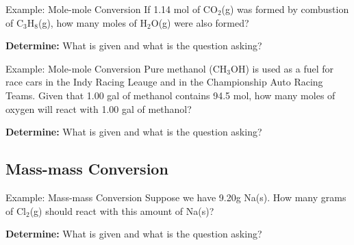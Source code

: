 \documentclass[11pt]{beamer}
\begin{document}
\begin{frame}{Example: Mole-mole Conversion}
  If 1.14 mol of CO$_2$(g) was formed by combustion of C$_3$H$_8$(g),
  how many moles of H$_2$O(g) were also formed?

  \textbf{Determine:} What is given and what is the question asking?


\end{frame}

\begin{frame}{Example: Mole-mole Conversion}
  Pure methanol (CH$_3$OH) is used as a fuel for race cars in the Indy Racing Leauge
  and in the Championship Auto Racing Teams. Given that 1.00 gal of methanol
  contains 94.5 mol, how many moles of oxygen will react with 1.00 gal of
  methanol?

  \textbf{Determine:} What is given and what is the question asking?
  

\end{frame}

\subsection{Mass-mass Conversion}

\begin{frame}{Example: Mass-mass Conversion}
  Suppose we have 9.20g Na(s). How many grams of Cl$_2$(g) should
  react with this amount of Na(s)?

  \textbf{Determine:} What is given and what is the question asking?


\end{frame}
\end{document}
